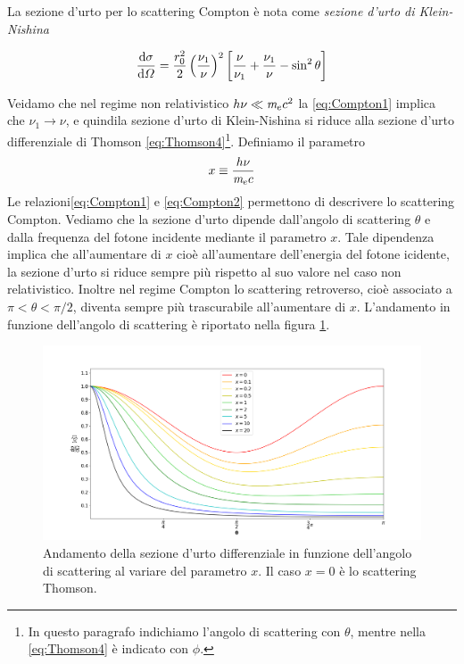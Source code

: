 La sezione d'urto per lo scattering Compton è nota come \textit{sezione d'urto di Klein-Nishina}
\begin{EQ}
\begin{equation}
\dfrac{\mathrm{d} {\sigma}}{\mathrm{d} {\Omega}}= \dfrac{r_0^2}{2}\left( \dfrac{\nu_1}{\nu} \right)^2 \left[ \dfrac{\nu}{\nu_1}+\dfrac{\nu_1}{\nu}-\sin^2\theta \right] \label{eq:Compton2}
\end{equation}
\end{EQ}
Veidamo che nel regime non relativistico $h\nu\ll\textit{m}_{e} c^2$ la \ref{eq:Compton1} implica che $\nu_1 \to \nu$, e quindila sezione d'urto di Klein-Nishina si riduce alla sezione d'urto differenziale di Thomson \ref{eq:Thomson4}\footnote{In questo paragrafo indichiamo l'angolo di scattering con $\theta$, mentre nella \ref{eq:Thomson4} è indicato con $\phi$.}. Definiamo il parametro
\begin{equation}
x \equiv \dfrac{h\nu}{\textit{m}_{e} c}
\end{equation}
Le relazioni\ref{eq:Compton1} e \ref{eq:Compton2} permettono di descrivere lo scattering Compton. Vediamo che la sezione d'urto dipende dall'angolo di scattering $\theta$ e dalla frequenza del fotone incidente mediante il parametro $x$. Tale dipendenza implica che all'aumentare di $x$ cioè all'aumentare dell'energia del fotone icidente, la sezione d'urto si riduce sempre più rispetto al suo valore nel caso non relativistico. Inoltre nel regime Compton lo scattering retroverso, cioè associato a $\pi<\theta<\pi/2$, diventa sempre più trascurabile all'aumentare di $x$. L'andamento in funzione dell'angolo di scattering è riportato nella figura \ref{fig:Compton2}.
\begin{figure}[t!]
\begin{center}
\includegraphics[width=\textwidth]{img/Compton2}
\caption{Andamento della sezione d'urto differenziale in funzione dell'angolo di scattering al variare del parametro $x$. Il caso $x=0$ è lo scattering Thomson.} \label{fig:Compton2}
\end{center}
\end{figure}

